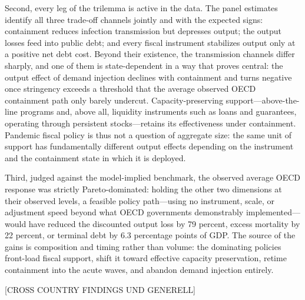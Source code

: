 \documentclass[12pt, a4paper]{article}
\begin{document}
Second, every leg of the trilemma is active in the data. The panel estimates identify all three trade-off channels jointly and with the expected signs: containment reduces infection transmission but depresses output; the output losses feed into public debt; and every fiscal instrument stabilizes output only at a positive net debt cost. Beyond their existence, the transmission channels differ sharply, and one of them is state-dependent in a way that proves central: the output effect of demand injection declines with containment and turns negative once stringency exceeds a threshold that the average observed OECD containment path only barely undercut. Capacity-preserving support---above-the-line
programs and, above all, liquidity instruments such as loans and guarantees, operating through persistent stocks---retains its effectiveness under containment. Pandemic fiscal policy is thus not a question of aggregate
size: the same unit of support has fundamentally different output effects depending on the instrument and the containment state in which it is deployed.

Third, judged against the model-implied benchmark, the observed average OECD response was strictly Pareto-dominated: holding the other two dimensions at their observed levels, a feasible policy path---using no instrument, scale, or adjustment speed beyond what OECD governments demonstrably implemented---would have reduced the discounted output loss by 79 percent, excess mortality by 22 percent, or terminal debt by 6.3 percentage points of GDP. The source of the gains is composition and timing rather than volume: the dominating policies front-load fiscal support, shift it toward effective capacity preservation, retime containment into the acute waves, and abandon
demand injection entirely. 

[CROSS COUNTRY FINDINGS UND GENERELL]
\end{document}
